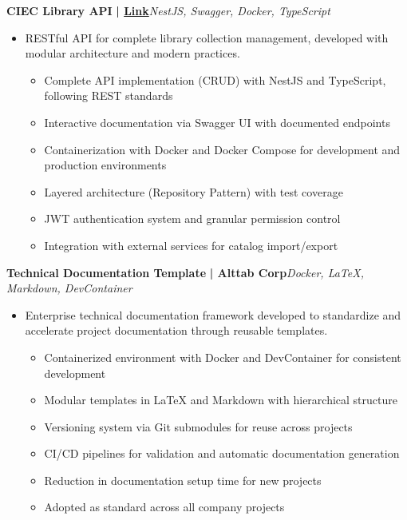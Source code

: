 \documentclass[a4paper]{article}
\begin{document}
{\textbf{CIEC Library API}}\textbf{ | \href{https://github.com/Alttabcorp/API-bibliteca_siec}{Link}}\hfill{\sl NestJS, Swagger, Docker, TypeScript}\\
\vspace{-3mm}
\begin{itemize} \itemsep -3pt
    \item[] RESTful API for complete library collection management, developed with modular architecture and modern practices.
        \begin{itemize}
            \item Complete API implementation (CRUD) with NestJS and TypeScript, following REST standards
            \item Interactive documentation via Swagger UI with documented endpoints
            \item Containerization with Docker and Docker Compose for development and production environments
            \item Layered architecture (Repository Pattern) with test coverage
            \item JWT authentication system and granular permission control
            \item Integration with external services for catalog import/export
        \end{itemize}
\end{itemize}
\vspace*{2mm}

{\textbf{Technical Documentation Template}}\textbf{ | Alttab Corp}\hfill{\sl Docker, LaTeX, Markdown, DevContainer}\\
\vspace{-3mm}
\begin{itemize} \itemsep -3pt
    \item[] Enterprise technical documentation framework developed to standardize and accelerate project documentation through reusable templates.
        \begin{itemize}
            \item Containerized environment with Docker and DevContainer for consistent development
            \item Modular templates in LaTeX and Markdown with hierarchical structure
            \item Versioning system via Git submodules for reuse across projects
            \item CI/CD pipelines for validation and automatic documentation generation
            \item Reduction in documentation setup time for new projects
            \item Adopted as standard across all company projects
        \end{itemize}
\end{itemize}
\vspace*{2mm}
\end{document}
